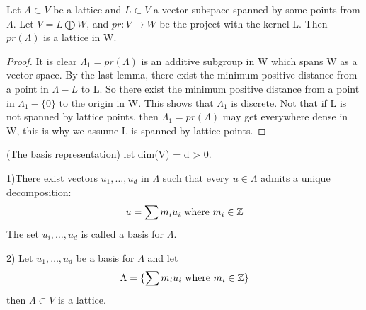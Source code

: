 \begin{corollary}
Let $\Lambda \subset V$ be a lattice and $L \subset V$ a vector subspace spanned by some points from $\Lambda$. Let $V = L \bigoplus W$, and $pr: V \to W$ be the project with the kernel L. Then $pr(\Lambda)$ is a lattice in W.
\end{corollary}
\begin{proof}
It is clear $\Lambda_1 = pr(\Lambda)$ is an additive subgroup in W which spans W as a vector space. By the last lemma, there exist the minimum positive distance from a point in $\Lambda - L$ to L.  So there exist the minimum positive distance from a point in $\Lambda_1 - \{0\}$ to the origin in W. This shows that $\Lambda_1$ is discrete. Not that if L is not spanned by lattice points, then $\Lambda_1 = pr(\Lambda)$ may get everywhere dense in W, this is why we assume L is spanned by lattice points.
\end{proof}





\begin{theorem}(The basis representation)
let dim(V) = d > 0. 

1)There exist vectors $u_1, \dots, u_d$ in $\Lambda$ such that every $u \in \Lambda$ admits a unique decomposition:
\[  u = \sum m_i u_i \text{ where } m_i \in \mathbb Z \]
The set $u_i, \dots, u_d$ is called a basis for $\Lambda$.


2) Let $u_1, \dots, u_d$ be a basis for $\Lambda$ and let
\[  \Lambda = \{ \sum m_i u_i \text{ where } m_i \in \mathbb Z \} \]
then $\Lambda \subset V$ is a lattice.
\end{theorem}

